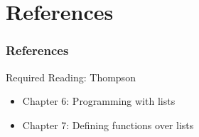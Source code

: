 \documentclass[dvipsnames]{beamer}
\theoremstyle{plain}
\begin{document}
\section*{References}

\begin{frame}
  \frametitle{References}

  \begin{block}{Required Reading: Thompson}
    \begin{itemize}
      \item Chapter 6: \alert{Programming with lists}
      \item Chapter 7: \alert{Defining functions over lists}
    \end{itemize}
  \end{block}
\end{frame}
\end{document}
